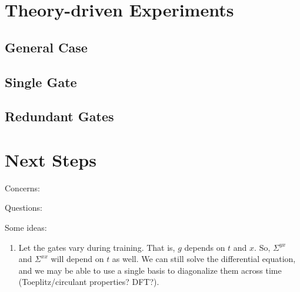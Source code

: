 \documentclass{article}
\begin{document}
\section{Theory-driven Experiments}

\subsection{General Case}

\subsection{Single Gate}

\subsection{Redundant Gates}


\section{Next Steps}
Concerns:

Questions:

Some ideas:
\begin{enumerate}
  \item Let the gates vary during training. 
  That is, $g$ depends on $t$ and $x$.
  So, $\Sigma^{yx}$ and $\Sigma^{xx}$ will depend on $t$ as well.
  We can still solve the differential equation, and we may be able to use a single basis to diagonalize them across time (Toeplitz/circulant properties? DFT?).
\end{enumerate}
\end{document}
